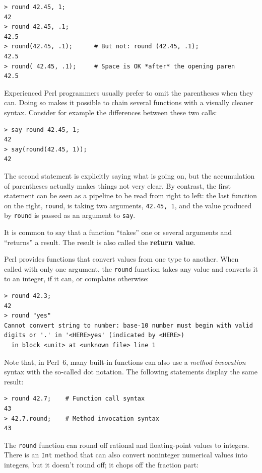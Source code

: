 \begin{verbatim}
> round 42.45, 1;
42
> round 42.45, .1;
42.5
> round(42.45, .1);      # But not: round (42.45, .1);
42.5
> round( 42.45, .1);     # Space is OK *after* the opening paren
42.5
\end{verbatim}

Experienced Perl programmers usually prefer to omit the parentheses 
when they can. Doing so makes it possible to chain several functions 
with a visually cleaner syntax. Consider for example the differences 
between these two calls:

\begin{verbatim}
> say round 42.45, 1;
42
> say(round(42.45, 1));
42
\end{verbatim}

The second statement is explicitly saying what is going on, but 
the accumulation of parentheses actually makes things 
not very clear. By contrast, the first statement can be seen 
as a pipeline to be read from right to left: the last function 
on the right, {\tt round}, is taking two arguments, 
{\tt 42.45, 1}, and the value produced by {\tt round} is 
passed as an argument to {\tt say}.

It is common to say that a function ``takes'' one or 
several arguments and ``returns'' a result.  The result is 
also called the {\bf return value}.

Perl provides functions that convert values from one type 
to another.  When called with only one argument, the 
{\tt round} function takes any value and converts it to an 
integer, if it can, or complains otherwise:

\begin{verbatim}
> round 42.3;
42
> round "yes"
Cannot convert string to number: base-10 number must begin with valid 
digits or '.' in '<HERE>yes' (indicated by <HERE>)
  in block <unit> at <unknown file> line 1
\end{verbatim}

%
Note that, in Perl~6, many built-in functions can also 
use a \emph{method invocation} syntax with the so-called 
dot notation. The following statements display the same result:
\begin{verbatim}
> round 42.7;    # Function call syntax
43
> 42.7.round;    # Method invocation syntax
43
\end{verbatim}
%
The {\tt round} function can round off rational and 
floating-point values to integers. There is an {\tt Int} 
method that can also convert noninteger numerical values 
into integers, but it doesn't round off; it chops off the 
fraction part:

